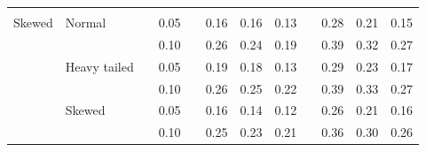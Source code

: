 \documentclass[12pt]{article} %
\begin{document}
\begin{table}[ht]
\begin{scriptsize}
\begin{center}
\begin{tabular}{ll p{.1cm} c p{.1cm} rrr p{.1cm} rrr}
             &&&&&&&&&&&\\
Skewed       & Normal       && 0.05 &&  0.16 & 0.16 & 0.13 && 0.28 & 0.21 & 0.15 \\ 
             &              && 0.10 &&  0.26 & 0.24 & 0.19 && 0.39 & 0.32 & 0.27 \\ 
             & Heavy tailed && 0.05 &&  0.19 & 0.18 & 0.13 && 0.29 & 0.23 & 0.17 \\ 
             &              && 0.10 &&  0.26 & 0.25 & 0.22 && 0.39 & 0.33 & 0.27 \\ 
             & Skewed       && 0.05 &&  0.16 & 0.14 & 0.12 && 0.26 & 0.21 & 0.16 \\ 
             &              && 0.10 &&  0.25 & 0.23 & 0.21 && 0.36 & 0.30 & 0.26 \\ 

\hline
\end{tabular}
\end{center}
\end{scriptsize}
\end{table}
\end{document}
